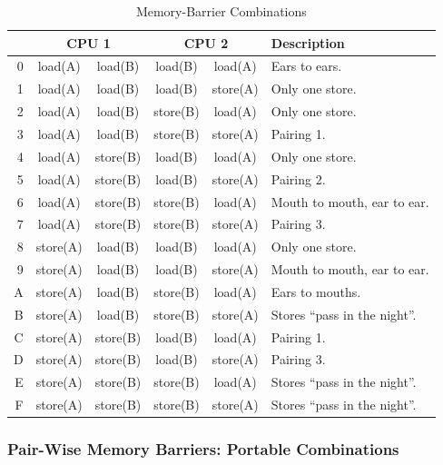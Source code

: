 \begin{table}
\begin{center}
\begin{tabular}{r||c|c||c|c||l}
	\multicolumn{1}{c||}{} & \multicolumn{2}{c||}{CPU 1} &
		\multicolumn{2}{c||}{CPU 2} & Description \\
	\hline
	\hline
	0 & load(A) & load(B) & load(B) & load(A) &
		Ears to ears. \\
	1 & load(A) & load(B) & load(B) & store(A) &
		Only one store. \\
	2 & load(A) & load(B) & store(B) & load(A) &
		Only one store. \\
	3 & load(A) & load(B) & store(B) & store(A) &
		Pairing 1. \\
	\hline
	4 & load(A) & store(B) & load(B) & load(A) &
		Only one store. \\
	5 & load(A) & store(B) & load(B) & store(A) &
		Pairing 2. \\
	6 & load(A) & store(B) & store(B) & load(A) &
		Mouth to mouth, ear to ear. \\
	7 & load(A) & store(B) & store(B) & store(A) &
		Pairing 3. \\
	\hline
	8 & store(A) & load(B) & load(B) & load(A) &
		Only one store. \\
	9 & store(A) & load(B) & load(B) & store(A) &
		Mouth to mouth, ear to ear. \\
	A & store(A) & load(B) & store(B) & load(A) &
		Ears to mouths. \\
	B & store(A) & load(B) & store(B) & store(A) &
		Stores ``pass in the night''. \\
	\hline
	C & store(A) & store(B) & load(B) & load(A) &
		Pairing 1. \\
	D & store(A) & store(B) & load(B) & store(A) &
		Pairing 3. \\
	E & store(A) & store(B) & store(B) & load(A) &
		Stores ``pass in the night''. \\
	F & store(A) & store(B) & store(B) & store(A) &
		Stores ``pass in the night''. \\
\end{tabular}
\end{center}
\caption{Memory-Barrier Combinations}
\label{tab:advsync:Memory-Barrier Combinations}
\end{table}

\subsubsection{Pair-Wise Memory Barriers: Portable Combinations}

